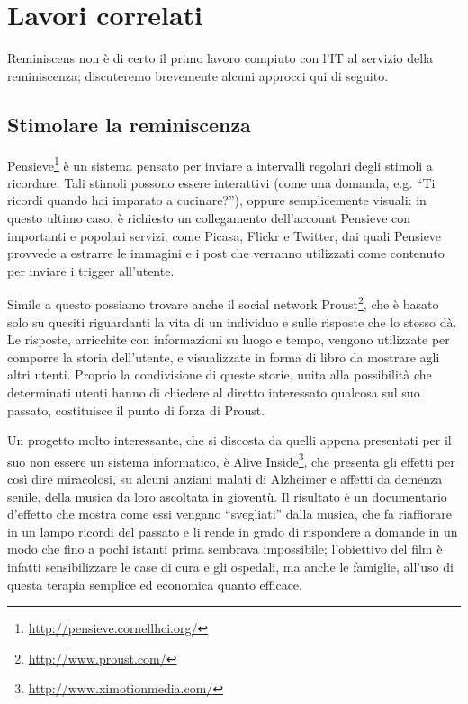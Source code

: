 \documentclass[sigproc-sp.tex]{subfiles}
\begin{document}
\section{Lavori correlati}
Reminiscens non è di certo il primo lavoro compiuto con l’IT al servizio della reminiscenza; discuteremo brevemente alcuni approcci qui di seguito.

\subsection{Stimolare la reminiscenza}
\label{subsec:stimuli}
Pensieve\footnote{\url{http://pensieve.cornellhci.org/}} è un sistema pensato per inviare a intervalli regolari degli stimoli a ricordare. Tali stimoli possono essere interattivi (come una domanda, e.g. “Ti ricordi quando hai imparato a cucinare?”), oppure semplicemente visuali: in questo ultimo caso, è richiesto un collegamento dell’account Pensieve con importanti e popolari servizi, come Picasa, Flickr e Twitter, dai quali Pensieve provvede a estrarre le immagini e i post che verranno utilizzati come contenuto per inviare i trigger all’utente.

Simile a questo possiamo trovare anche il social network Proust\footnote{\url{http://www.proust.com/}}, che è basato solo su quesiti riguardanti la vita di un individuo e sulle risposte che lo stesso dà. Le risposte, arricchite con informazioni su luogo e tempo, vengono utilizzate per comporre la storia dell’utente, e visualizzate in forma di libro da mostrare agli altri utenti. Proprio la condivisione di queste storie, unita alla possibilità che determinati utenti hanno di chiedere al diretto interessato qualcosa sul suo passato, costituisce il punto di forza di Proust.

Un progetto molto interessante, che si discosta da quelli appena presentati per il suo non essere un sistema informatico, è Alive Inside\footnote{\url{http://www.ximotionmedia.com/}}, che presenta gli effetti per così dire miracolosi, su alcuni anziani malati di Alzheimer e affetti da demenza senile, della musica da loro ascoltata in gioventù. Il risultato è un documentario d’effetto che mostra come essi vengano “svegliati” dalla musica, che fa riaffiorare in un lampo ricordi del passato e li rende in grado di rispondere a domande in un modo che fino a pochi istanti prima sembrava impossibile; l’obiettivo del film è infatti sensibilizzare le case di cura e gli ospedali, ma anche le famiglie, all’uso di questa terapia semplice ed economica quanto efficace.
\end{document}
